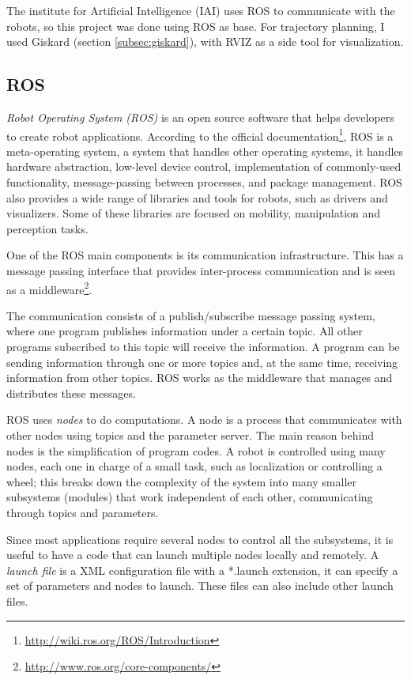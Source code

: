 The  institute for Artificial Intelligence (IAI) uses ROS to communicate with the robots, so this project was done using ROS as base. For trajectory planning, I used Giskard (section \ref{subsec:giskard}), with RVIZ as a side tool for visualization.

\subsection{ROS}
\label{sec:ros}

\textit{Robot Operating System (ROS)} is an open source software that helps developers to create robot applications. According to the official documentation\footnote{\url{http://wiki.ros.org/ROS/Introduction}}, ROS is a meta-operating system, a system that handles other operating systems, it handles hardware abstraction, low-level device control, implementation of commonly-used functionality, message-passing between processes, and package management. ROS also provides a wide range of libraries and tools for robots, such as drivers and visualizers. Some of these libraries are focused on mobility, manipulation and perception tasks.

One of the ROS main components is its communication infrastructure. This has a message passing interface that provides inter-process communication and is seen as a middleware\footnote{\url{http://www.ros.org/core-components/}}. 

The communication consists of a publish/subscribe message passing system, where one program publishes information under a certain topic. All other programs subscribed to this topic will receive the information. A program can be sending information through one or more topics and, at the same time, receiving information from other topics. ROS works as the middleware that manages and distributes these messages.

ROS uses \textit{nodes} to do computations. A node is a process that communicates with other nodes using topics and the parameter server. The main reason behind nodes is the simplification of program codes. A robot is controlled using many nodes, each one in charge of a small task, such as localization or controlling a wheel; this breaks down the complexity of the system into many smaller subsystems (modules) that work independent of each other, communicating through topics and parameters.

Since most applications require several nodes to control all the subsystems, it is useful to have a code that can launch multiple nodes locally and remotely. A \textit{launch file} is a XML configuration file with a *.launch extension, it can specify a set of parameters and nodes to launch. These files can also include other launch files. 



